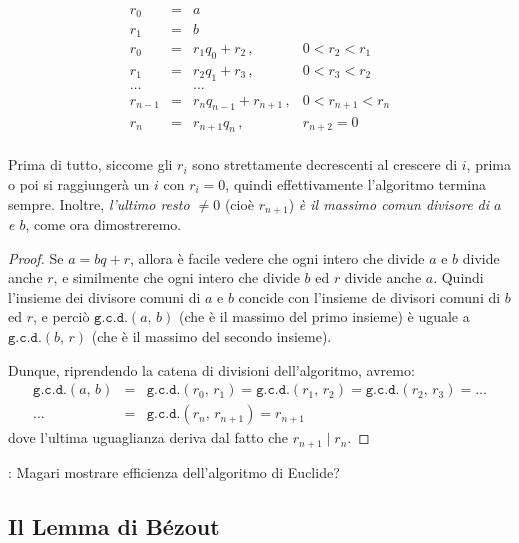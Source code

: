 \documentclass[pdflatex,11pt,a4paper,oneside]{article}
\newcommand{\XXX}[1][XXX]{\text{\bfseries{\color{red}{\emph{#1}}}}}
\newcommand{\TODO}[0]{\XXX[TODO]}
\newcommand{\divides}[0]{\mid}
\newcommand{\gcdop}[0]{\ensuremath{\mathtt{g.c.d.}}}
\newcommand{\xgcd}[1]{\ensuremath{\gcdop\left({#1}\right)}}
\renewcommand{\gcd}[2]{\xgcd{{#1},\,{#2}}}
\begin{document}
\begin{displaymath}
  \begin{array}{rcll}
      r_0  & \!=\! & a \\
      r_1  & \!=\! & b \\
      r_0  & \!=\! & r_1 q_0 + r_2\,, & 0 < r_2 < r_1 \\
      r_1  & \!=\! & r_2 q_1 + r_3\,, & 0 < r_3 < r_2 \\
    \ldots &       & \ldots \\
   r_{n-1} & \!=\! & r_{n} q_{n-1} + r_{n+1}\,, & 0 < r_{n+1} < r_{n} \\
     r_{n} & \!=\! & r_{n+1} q_{n}\,, & r_{n+2} = 0 \\
  \end{array}
\end{displaymath}

Prima di tutto, siccome gli $r_i$ sono strettamente decrescenti al
crescere di $i$, prima o poi si raggiunger\`a un $i$ con $r_i = 0$,
quindi effettivamente l'algoritmo termina sempre.  Inoltre, \emph{l'ultimo
resto $\neq 0$} (cio\`e $r_{n+1}$) \emph{\`e il massimo comun divisore di
$a$ e $b$}, come ora dimostreremo.

\begin{proof}
Se $a = bq + r$, allora \`e facile vedere che ogni intero che divide
$a$ e $b$ divide anche $r$, e similmente che ogni intero che divide $b$
ed $r$ divide anche $a$.  Quindi l'insieme dei divisore comuni di $a$ e
$b$ concide con l'insieme de divisori comuni di $b$ ed $r$, e perci\`o
$\gcd{a}{b}$ (che \`e il massimo del primo insieme) \`e uguale a
$\gcd{b}{r}$ (che \`e il massimo del secondo insieme).

\smallskip
\noindent
Dunque, riprendendo la catena di divisioni dell'algoritmo, avremo:
\begin{eqnarray*}
  \gcd{a}{b}
    & =
    & \gcd{r_0}{r_1} = \gcd{r_1}{r_2} = \gcd{r_2}{r_3} = \ldots \\
  \ldots
    & =
    & \gcd{r_n}{r_{n+1}} = r_{n+1}
\end{eqnarray*}
dove l'ultima uguaglianza deriva dal fatto che $r_{n+1} \divides r_n$.
\end{proof}

\noindent
\TODO: Magari mostrare efficienza dell'algoritmo di Euclide?


\subsection{Il Lemma di B\'ezout}
\end{document}
